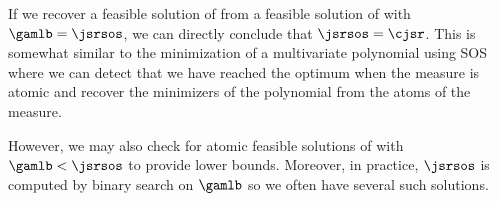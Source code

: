 If we recover a feasible solution of  from a feasible solution of  with $\gamlb = \jsrsos$,
we can directly conclude that $\jsrsos = \cjsr$.
This is somewhat similar to the minimization of a multivariate polynomial using SOS where we can detect that we have reached the optimum
when the measure is atomic and recover the minimizers of the polynomial from the atoms of the measure. %

However, we may also check for atomic feasible solutions of  with $\gamlb < \jsrsos$ to provide lower bounds.
Moreover, in practice, $\jsrsos$ is computed by binary search on $\gamlb$ so we often have several such solutions.










